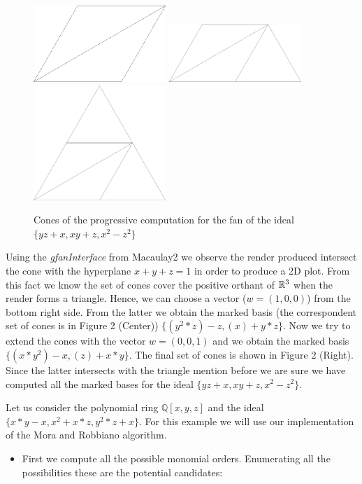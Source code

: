\begin{example}
  \begin{figure}[h]
    \centering
    \includegraphics[width=5cm]{workingExample1}
    \includegraphics[width=5cm]{workingExample2}
    \includegraphics[width=5cm]{ideal2}
    \caption{Cones of the progressive computation for the \grob fan of the ideal
      $\{yz + x, xy + z, x^2 -z^2\}$}
  \end{figure}

  Using the \emph{gfanInterface} \cite{gfan} from Macaulay2 \cite{M2} we observe the render produced
  intersect the cone with the hyperplane $x + y + z = 1$ in order to produce a 2D plot. From this
  fact we know the set of cones cover the positive orthant of $\mathbb{R}^3$ when the render forms a triangle.
  Hence, we can choose a vector ($w = (1, 0, 0)$) from the bottom right side. From the latter
  we obtain the marked \grob basis (the correspondent set of cones is in Figure 2 (Center)) $\{(y^2*z) -z, (x) + y*z\}$.
  Now we try to extend the cones with the vector $w = (0, 0, 1)$ and we obtain the marked \grob
  basis $\{(x*y^2) -x, (z) + x*y\}$. The final set of cones is shown in Figure 2 (Right). Since
  the latter intersects with the triangle mention before we are sure we have computed all the
  marked \grob bases for the ideal $\{yz + x, xy + z, x^2 -z^2\}$.
\end{example}

\begin{example}
  Let us consider the polynomial ring $\mathbb{Q}[x, y, z]$ and
  the ideal $\{x*y - x, x^2 + x*z, y^2*z + x\}$. For this example we will
  use our implementation of the Mora and Robbiano algorithm.

  \begin{itemize}
  \item First we compute all the possible monomial orders. Enumerating all the possibilities
    these are the potential candidates:
  \end{itemize}
\end{example}


